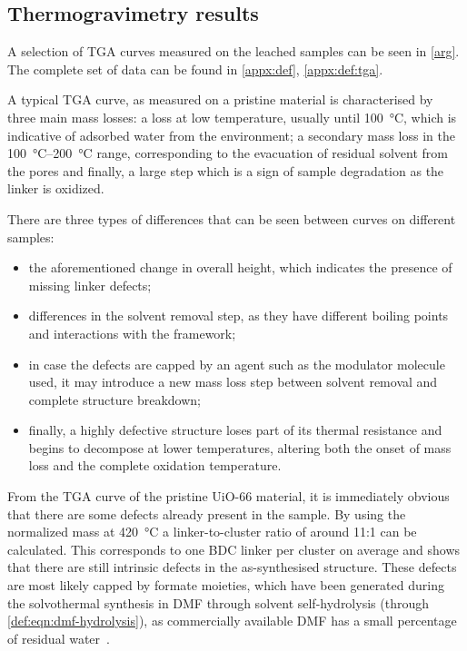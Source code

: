 
\subsection{Thermogravimetry results}

A selection of TGA curves measured on the leached samples
can be seen in \autoref{arg}. The complete set of data
can be found in \autoref{appx:def}, \autoref{appx:def:tga}.

A typical TGA curve, as measured on a pristine material
is characterised by three main mass losses: a loss
at low temperature, usually until \SI{100}{\degreeCelsius},
which is indicative of adsorbed water from the environment;
a secondary mass loss in the \SIrange{100}{200}{\degreeCelsius}
range, corresponding to the evacuation of residual solvent 
from the pores and finally, a large step which is a sign of 
sample degradation as the linker is oxidized.

There are three types of differences that can be seen 
between curves on different samples:

\begin{itemize}
    \item the aforementioned change in overall height,
    which indicates the presence of missing linker defects;
    \item differences in the solvent removal step, as they
    have different boiling points and interactions with the 
    framework;
    \item in case the defects are capped by an agent such as 
    the modulator molecule used, it may introduce a new 
    mass loss step between solvent removal and complete
    structure breakdown;
    \item finally, a highly defective structure loses part 
    of its thermal resistance and begins to decompose 
    at lower temperatures, altering both the onset of mass
    loss and the complete oxidation temperature.
\end{itemize}

From the TGA curve of the pristine UiO-66 material, 
it is immediately obvious that there are some defects 
already present in the sample. By using the normalized
mass at \SI{420}{\degreeCelsius} a linker-to-cluster 
ratio of around 11:1 can be calculated. This corresponds 
to one BDC linker per cluster on average and shows that
there are still intrinsic defects in the as-synthesised 
structure. These defects are most likely capped by 
formate moieties, which have been generated during 
the solvothermal synthesis in DMF through solvent 
self-hydrolysis (through \autoref{def:eqn:dmf-hydrolysis}), as 
commercially available DMF has a small percentage of 
residual water~\cite{shearerDefectEngineeringTuning2016}.

